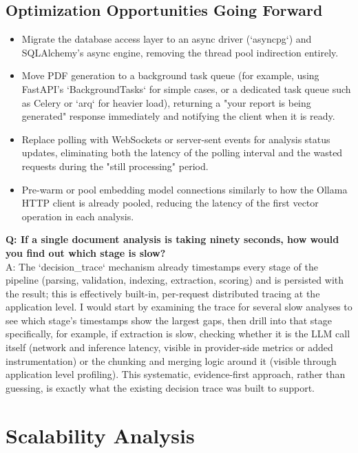 \documentclass[11pt,a4paper]{report}
\begin{document}
\section{Optimization Opportunities Going Forward}

\begin{itemize}[leftmargin=*]
  \item Migrate the database access layer to an async driver (`asyncpg`) and SQLAlchemy's async engine, removing the thread pool indirection entirely.
  \item Move PDF generation to a background task queue (for example, using FastAPI's `BackgroundTasks` for simple cases, or a dedicated task queue such as Celery or `arq` for heavier load), returning a "your report is being generated" response immediately and notifying the client when it is ready.
  \item Replace polling with WebSockets or server-sent events for analysis status updates, eliminating both the latency of the polling interval and the wasted requests during the "still processing" period.
  \item Pre-warm or pool embedding model connections similarly to how the Ollama HTTP client is already pooled, reducing the latency of the first vector operation in each analysis.
\end{itemize}

\begin{qabox}
\textbf{Q: If a single document analysis is taking ninety seconds, how would you find out which stage is slow?} \\
A: The `decision\_trace` mechanism already timestamps every stage of the pipeline (parsing, validation, indexing, extraction, scoring) and is persisted with the result; this is effectively built-in, per-request distributed tracing at the application level. I would start by examining the trace for several slow analyses to see which stage's timestamps show the largest gaps, then drill into that stage specifically, for example, if extraction is slow, checking whether it is the LLM call itself (network and inference latency, visible in provider-side metrics or added instrumentation) or the chunking and merging logic around it (visible through application level profiling). This systematic, evidence-first approach, rather than guessing, is exactly what the existing decision trace was built to support.
\end{qabox}

\chapter{Scalability Analysis}
\end{document}
